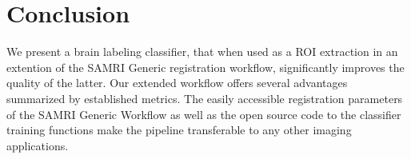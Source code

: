 \documentclass[11pt, english]{article}
\begin{document}
    \begin{sansmath}
    \end{sansmath}


    \section{Conclusion}
    We present a brain labeling classifier, that when used as a ROI extraction in an extention of the SAMRI Generic
    registration workflow, significantly improves the quality of the latter.
    Our extended workflow offers several advantages summarized by established metrics.
    The easily accessible registration parameters of the SAMRI Generic Workflow as well as the open source
    code to the classifier training functions make the pipeline transferable to any other imaging applications.




    \clearpage
    \printbibliography
\end{document}
